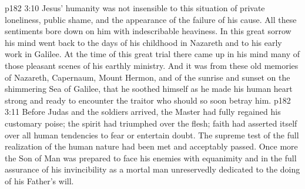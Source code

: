 \vs p182 3:10 Jesus’ humanity was not insensible to this situation of private loneliness, public shame, and the appearance of the failure of his cause. All these sentiments bore down on him with indescribable heaviness. In this great sorrow his mind went back to the days of his childhood in Nazareth and to his early work in Galilee. At the time of this great trial there came up in his mind many of those pleasant scenes of his earthly ministry. And it was from these old memories of Nazareth, Capernaum, Mount Hermon, and of the sunrise and sunset on the shimmering Sea of Galilee, that he soothed himself as he made his human heart strong and ready to encounter the traitor who should so soon betray him.
\vs p182 3:11 Before Judas and the soldiers arrived, the Master had fully regained his customary poise; the spirit had triumphed over the flesh; faith had asserted itself over all human tendencies to fear or entertain doubt. The supreme test of the full realization of the human nature had been met and acceptably passed. Once more the Son of Man was prepared to face his enemies with equanimity and in the full assurance of his invincibility as a mortal man unreservedly dedicated to the doing of his Father’s will.
